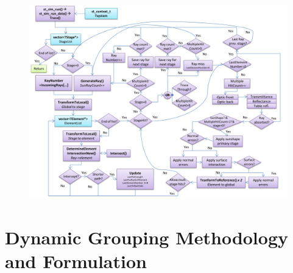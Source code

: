 \documentclass[11pt,letterpaper]{article}
\begin{document}




\begin{landscape}
\begin{figure}[p]
\centering
\includegraphics[height=0.92\textwidth]{coretrace-layout}	%
\caption{}
\label{fig:coretrace-layout}
\end{figure}
\end{landscape}







\section{Dynamic Grouping Methodology and Formulation}
\end{document}
